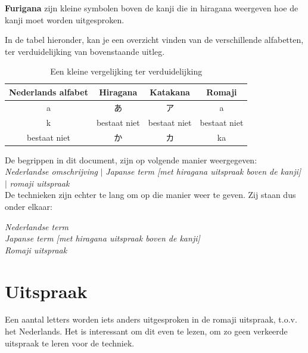 \documentclass[a4paper, 12pt]{article}
\begin{document}
\begin{CJK}{UTF8}{min}
\noindent \textbf{Furigana} zijn kleine symbolen boven de kanji die in hiragana weergeven hoe de kanji moet worden uitgesproken.

\noindent In de tabel hieronder, kan je een overzicht vinden van de verschillende alfabetten, ter verduidelijking van bovenstaande uitleg.\\

\begin{table}[H]
\begin{center}
\begin{tabular}{c|c|c|c}
Nederlands alfabet & Hiragana & Katakana & Romaji\\
\hline
a &  あ & ア & a\\
k & bestaat niet & bestaat niet & bestaat niet\\
bestaat niet & か & カ & ka
\end{tabular}
\end{center}
\caption{Een kleine vergelijking ter verduidelijking}
\label{vergelijking_alfabetten}
\end{table}

\noindent De begrippen in dit document, zijn op volgende manier weergegeven:\\

\textit{Nederlandse omschrijving} $|$ \textit{Japanse term [met hiragana uitspraak boven de kanji]} $|$ \textit{romaji uitspraak}\\

\noindent De technieken zijn echter te lang om op die manier weer te geven. Zij staan dus onder elkaar:\\

\begin{center}
\textit{Nederlandse term}\\
\textit{Japanse term [met hiragana uitspraak boven de kanji]}\\
\textit{Romaji uitspraak}
\end{center}


\section{Uitspraak}
\noindent Een aantal letters worden iets anders uitgesproken in de romaji uitspraak, t.o.v. het Nederlands.
Het is interessant om dit even te lezen, om zo geen verkeerde uitspraak te leren voor de techniek.\\


\end{CJK}
\end{document}
